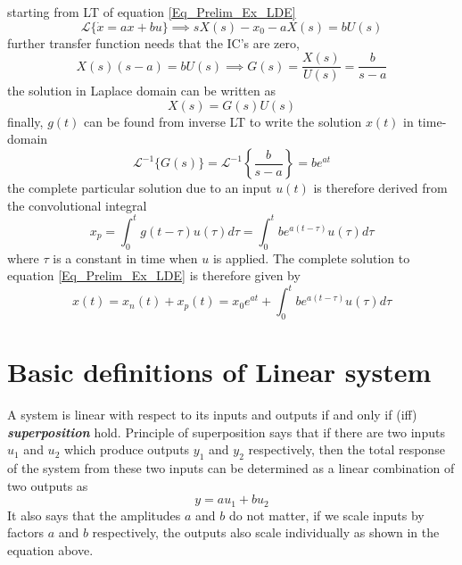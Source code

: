 starting from LT of equation \eqref{Eq_Prelim_Ex_LDE}
\begin{equation}
	\mathcal{L} \{ \dot{x} = a x + b u \} \implies s X(s) - x_0 - a X(s) = b U(s)
\end{equation}
further transfer function needs that the IC's are zero,
\begin{equation}
	X(s) (s - a) = b U(s) \implies G(s) = \frac{X(s)}{U(s)} = \frac{b}{s - a} 
\end{equation}
the solution in Laplace domain can be written as
\begin{equation}
	X(s) = G(s)U(s)
\end{equation}
finally, $g(t)$ can be found from inverse LT to write the solution $x(t)$ in time-domain 
\begin{equation}
	\mathcal{L}^{-1} \{ G(s) \} = \mathcal{L}^{-1} \left\{\frac{b}{s-a}\right\} = b e^{at}
\end{equation}
the complete particular solution due to an input $u(t)$ is therefore derived from the convolutional integral
\begin{equation} \label{Eq_Prelim_LDE_Ex_ParticularSolution}
	x_p = \int_{0}^{t} g(t - \tau) u(\tau) d\tau = \int_{0}^{t} b e^{a(t - \tau)} u(\tau) d\tau
\end{equation}
where $\tau$ is a constant in time when $u$ is applied. The complete solution to equation \eqref{Eq_Prelim_Ex_LDE} is therefore given by
\begin{equation} \label{Eq_Prelim_LDE_Ex_FullSolution}
	x(t) = x_{n}(t) + x_{p}(t) = x_0 e^{at} + \int_{0}^{t} b e^{a(t - \tau)} u(\tau) d\tau
\end{equation}

\section{Basic definitions of Linear system}

A system is linear with respect to its inputs and outputs if and only if (iff) \textbf{\textit{superposition}} hold. Principle of superposition says that if there are two inputs $u_1$ and $u_2$ which produce outputs $y_1$ and $y_2$ respectively, then the total response of the system from these two inputs can be determined as a linear combination of two outputs as
\begin{equation}
	y = a u_1 + b u_2
\end{equation}
It also says that the amplitudes $a$ and $b$ do not matter, if we scale inputs by factors $a$ and $b$ respectively, the outputs also scale individually as shown in the equation above.

